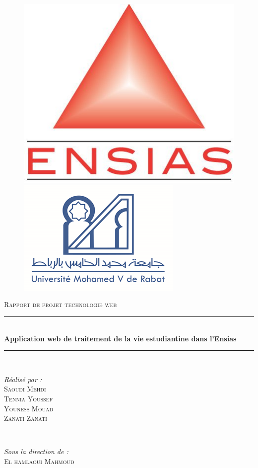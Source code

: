 \documentclass[11.5pt]{report}
\begin{document}
	
\begin{titlepage} 
	\begin{figure}[h]
		\begin{minipage}[c]{.46\linewidth}
			\flushleft
			\includegraphics[height=100 pt, width=120 pt]{Ensias2.jpg}
		
		\end{minipage}
		\hfill%
		\begin{minipage}[c]{.46\linewidth}
			\flushright
			\includegraphics[height=100 pt, width=120 pt]{um5.png}
		
		\end{minipage}
	\end{figure}
	
	
	\newcommand{\HRule}{\rule{\linewidth}{0.5mm}} %
	
	\centering 
	
	\vspace{2cm}
	
	\textsc{\LARGE Rapport de projet technologie web}\\[1.5cm] 
	
	\vspace{1cm}
	
	\HRule\\[0.4cm]
	
	{\huge\bfseries Application web de traitement de la vie estudiantine dans l'Ensias }\\[0.4cm] 
	
	\HRule\\[4cm]
	
	\begin{minipage}{0.4\textwidth}
		\begin{flushleft}
			\large
			\textit{Réalisé par :}\\
			\textsc{Saoudi Mehdi}\\ 
			\textsc{Tennia Youssef}\\ 
			\textsc{Youness Mouad}\\ 
			\textsc{Zanati Zanati}\\ 
		\end{flushleft}
	\end{minipage}
	~
	\begin{minipage}{0.4\textwidth}
		\begin{flushright}
			\large
			\textit{Sous la direction de :}\\
		    \textsc{El hamlaoui Mahmoud} 
		\end{flushright}
	\end{minipage}


\end{titlepage}
\end{document}
